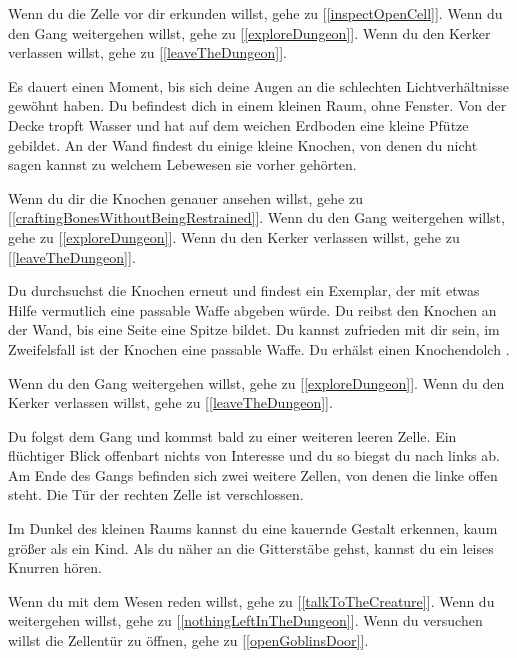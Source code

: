 Wenn du die Zelle vor dir erkunden willst, gehe zu [\ref{inspectOpenCell}].
Wenn du den Gang weitergehen willst, gehe zu [\ref{exploreDungeon}].
Wenn du den Kerker verlassen willst, gehe zu [\ref{leaveTheDungeon}].


Es dauert einen Moment, bis sich deine Augen an die schlechten Lichtverhältnisse gewöhnt haben. Du befindest dich in einem kleinen Raum, ohne Fenster. Von der Decke tropft Wasser und hat auf dem weichen Erdboden eine kleine Pfütze gebildet. An der Wand findest du einige kleine Knochen, von denen du nicht sagen kannst zu welchem Lebewesen sie vorher gehörten.

Wenn du dir die Knochen genauer ansehen willst, gehe zu [\ref{craftingBonesWithoutBeingRestrained}].
Wenn du den Gang weitergehen willst, gehe zu [\ref{exploreDungeon}].
Wenn du den Kerker verlassen willst, gehe zu [\ref{leaveTheDungeon}].


Du durchsuchst die Knochen erneut und findest ein Exemplar, der mit etwas Hilfe vermutlich eine passable Waffe abgeben würde. Du reibst den Knochen an der Wand, bis eine Seite eine Spitze bildet. Du kannst zufrieden mit dir sein, im Zweifelsfall ist der Knochen eine passable Waffe.
Du erhälst einen Knochendolch .

Wenn du den Gang weitergehen willst, gehe zu [\ref{exploreDungeon}].
Wenn du den Kerker verlassen willst, gehe zu [\ref{leaveTheDungeon}].


Du folgst dem Gang und kommst bald zu einer weiteren leeren Zelle. Ein flüchtiger Blick offenbart nichts von Interesse und du so biegst du nach links ab. Am Ende des Gangs befinden sich zwei weitere Zellen, von denen die linke offen steht. Die Tür der rechten Zelle ist verschlossen.

Im Dunkel des kleinen Raums kannst du eine kauernde Gestalt erkennen, kaum größer als ein Kind.
Als du näher an die Gitterstäbe gehst, kannst du ein leises Knurren hören.

Wenn du mit dem Wesen reden willst, gehe zu [\ref{talkToTheCreature}].
Wenn du weitergehen willst, gehe zu [\ref{nothingLeftInTheDungeon}].
Wenn du versuchen willst die Zellentür zu öffnen, gehe zu [\ref{openGoblinsDoor}].


